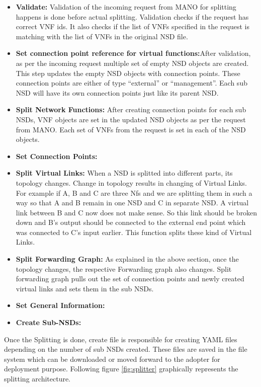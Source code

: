 \begin{itemize}
	\item \textbf{Validate: }Validation of the incoming request from MANO for splitting happens is done before actual splitting. Validation checks if the request has correct VNF ids. It also checks if the list of VNFs specified in the request is matching with the list of VNFs in the original NSD file.
	\item \textbf{Set connection point reference for virtual functions:}After validation, as per the incoming request multiple set of empty NSD objects are created. This step updates the empty NSD objects with connection points. These connection points are either of type “external” or “management”. Each sub NSD will have its own connection points just like its parent NSD.
	\item \textbf{Split Network Functions: }After creating connection points for each sub NSDs, VNF objects are set in the updated NSD objects as per the request from MANO. Each set of VNFs from the request is set in each of the NSD objects. 
	\item \textbf{Set Connection Points: }
	\item \textbf{Split Virtual Links: }When a NSD is splitted into different parts, its topology changes. Change in topology results in changing of Virtual Links. For example if A, B and C are three Nfs and we are splitting them in such a way so that A and B remain in one NSD and C in separate NSD. A virtual link between B and C now does not make sense. So this link should be broken down and B’s output should be connected to the external end point which was connected to C’s input earlier. This function splits these kind of Virtual Links.
	\item \textbf{Split Forwarding Graph: }As explained in the above section, once the topology changes, the respective Forwarding graph also changes. Split forwarding graph pulls out the set of connection points and newly created virtual links and sets them in the sub NSDs.
	\item \textbf{Set General Information: }
	\item \textbf{Create Sub-NSDs: }
\end{itemize} 

Once the Splitting is done, create file is responsible for creating YAML files depending on the number of sub NSDs created. These files are saved in the file system which can be downloaded or moved forward to the adopter for deployment purpose. Following figure \ref{fig:splitter} graphically represents the splitting architecture.



